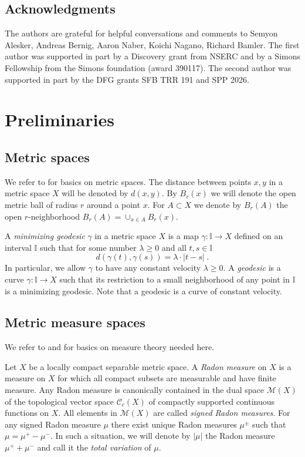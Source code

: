 \documentclass[12pt,leqno]{amsart}
\numberwithin{equation}{section}
\theoremstyle{definition}
\theoremstyle{remark}
\def\:{\colon}
\begin{document}
\subsection{Acknowledgments}  The authors are grateful for helpful conversations  and comments to  Semyon Alesker, Andreas Bernig, Aaron Naber, Koichi Nagano, Richard Bamler.
The first author was supported in part by a Discovery grant from NSERC and by  a Simons Fellowship from the Simons foundation (award 390117). The second author was supported in part by the DFG grants  SFB TRR 191 and SPP 2026.


\section{Preliminaries} \label{sec:prelim}
\subsection{Metric spaces}
We refer to \cite{BBI01} for basics on metric spaces.
The distance between points $x,y$ in a metric space $X$ will be denoted by $d(x,y)$.
By $B_r(x)$ we will denote the open metric ball of radius $r$ around a point $x$. For $A\subset X$
we denote by $B_r (A)$ the open $r$-neighborhood $B_r (A) =\cup _{x\in A} B_r (x)$.


A \emph {minimizing geodesic} $\gamma$ in a metric space $X$ is  a map $\gamma  : \mathbb I\to X$ defined on  an interval $\mathbb I$  such that for some number $\lambda \geq 0$  and all $t,s\in \mathbb I$
$$ d(\gamma (t),\gamma (s)) =\lambda \cdot |t-s| \;.$$
 In particular, we allow $\gamma$ to have any constant velocity $\lambda \geq 0$.
A \emph{geodesic} is a curve $\gamma\: \mathbb I\to X$ such that its restriction to a small neighborhood of any point in $\mathbb I$ is  a minimizing geodesic. Note that a  geodesic is a curve of constant velocity.

\subsection{Metric measure spaces} We refer to \cite{Federer} and \cite{Evans} for basics on measure theory needed here.

Let $X$ be a locally compact separable metric space. A \emph{Radon measure} on $X$ is a measure on $X$ for which all compact subsets are measurable and have finite measure.
Any Radon measure is canonically contained in the dual space $\mathcal M(X)$ of the topological vector space $\mathcal C_c (X)$ of compactly supported continuous functions on $X$.
All elements in $\mathcal M(X)$ are called \emph{signed Radon measures}. For any signed Radon measure $\mu$ there exist unique Radon measures $\mu ^{\pm}$ such that $\mu =\mu ^+- \mu ^-$.
In such a situation, we will denote by $|\mu |$ the Radon measure $\mu ^+ +\mu ^-$ and call it the \emph{total variation} of $\mu$.
\end{document}

